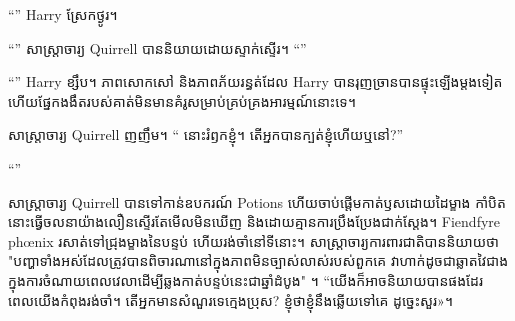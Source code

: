 “” Harry ស្រែកថ្ងូរ។

“” សាស្ត្រាចារ្យ Quirrell បាននិយាយដោយស្ទាក់ស្ទើរ។ “”

“” Harry ខ្សឹប។ ភាពសោកសៅ និងភាពភ័យរន្ធត់ដែល Harry បានរុញច្រានបានផ្ទុះឡើងម្តងទៀត ហើយផ្នែកងងឹតរបស់គាត់មិនមានគំរូសម្រាប់គ្រប់គ្រងអារម្មណ៍នោះទេ។ 

សាស្រ្តាចារ្យ Quirrell ញញឹម។ “ នោះរំឭកខ្ញុំ។ តើអ្នកបានក្បត់ខ្ញុំហើយឬនៅ?”

“”

សាស្ត្រាចារ្យ Quirrell បានទៅកាន់ឧបករណ៍ Potions ហើយចាប់ផ្តើមកាត់ឫសដោយដៃម្ខាង កាំបិតនោះធ្វើចលនាយ៉ាងលឿនស្ទើរតែមើលមិនឃើញ និងដោយគ្មានការប្រឹងប្រែងជាក់ស្តែង។ Fiendfyre phœnix រសាត់ទៅជ្រុងម្ខាងនៃបន្ទប់ ហើយរង់ចាំនៅទីនោះ។ សាស្ត្រាចារ្យការពារជាតិបាននិយាយថា "បញ្ហាទាំងអស់ដែលត្រូវបានពិចារណានៅក្នុងភាពមិនច្បាស់លាស់របស់ពួកគេ វាហាក់ដូចជាឆ្លាតវៃជាងក្នុងការចំណាយពេលវេលាដើម្បីឆ្លងកាត់បន្ទប់នេះជាឆ្នាំដំបូង" ។ “យើង​ក៏​អាច​និយាយ​បាន​ផង​ដែរ ពេល​យើង​កំពុង​រង់ចាំ។ តើអ្នកមានសំណួរទេក្មេងប្រុស? ខ្ញុំ​ថា​ខ្ញុំ​នឹង​ឆ្លើយ​ទៅ​គេ ដូច្នេះ​សួរ»។

